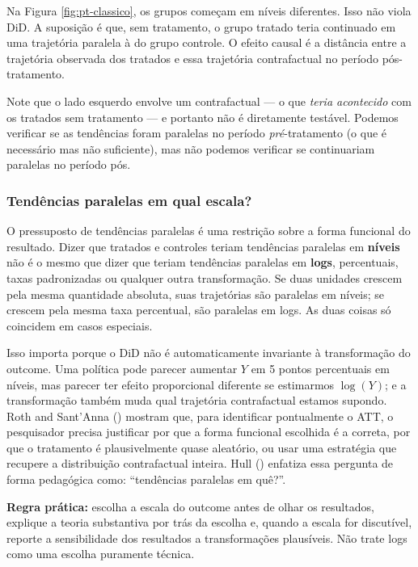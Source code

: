 \documentclass[
]{article}
\begin{document}
Na Figura \ref{fig:pt-classico}, os grupos começam em níveis diferentes. Isso não viola DiD. A suposição é que, sem tratamento, o grupo tratado teria continuado em uma trajetória paralela à do grupo controle. O efeito causal é a distância entre a trajetória observada dos tratados e essa trajetória contrafactual no período pós-tratamento.

Note que o lado esquerdo envolve um contrafactual --- o que \emph{teria acontecido} com os tratados sem tratamento --- e portanto não é diretamente testável. Podemos verificar se as tendências foram paralelas no período \emph{pré}-tratamento (o que é necessário mas não suficiente), mas não podemos verificar se continuariam paralelas no período pós.

\subsubsection{Tendências paralelas em qual escala?}\label{tenduxeancias-paralelas-em-qual-escala}

O pressuposto de tendências paralelas é uma restrição sobre a forma funcional do resultado. Dizer que tratados e controles teriam tendências paralelas em \textbf{níveis} não é o mesmo que dizer que teriam tendências paralelas em \textbf{logs}, percentuais, taxas padronizadas ou qualquer outra transformação. Se duas unidades crescem pela mesma quantidade absoluta, suas trajetórias são paralelas em níveis; se crescem pela mesma taxa percentual, são paralelas em logs. As duas coisas só coincidem em casos especiais.

Isso importa porque o DiD não é automaticamente invariante à transformação do outcome. Uma política pode parecer aumentar \(Y\) em 5 pontos percentuais em níveis, mas parecer ter efeito proporcional diferente se estimarmos \(\log(Y)\); e a transformação também muda qual trajetória contrafactual estamos supondo. Roth and Sant'Anna () mostram que, para identificar pontualmente o ATT, o pesquisador precisa justificar por que a forma funcional escolhida é a correta, por que o tratamento é plausivelmente quase aleatório, ou usar uma estratégia que recupere a distribuição contrafactual inteira. Hull () enfatiza essa pergunta de forma pedagógica como: ``tendências paralelas em quê?''.

\textbf{Regra prática:} escolha a escala do outcome antes de olhar os resultados, explique a teoria substantiva por trás da escolha e, quando a escala for discutível, reporte a sensibilidade dos resultados a transformações plausíveis. Não trate logs como uma escolha puramente técnica.
\end{document}
